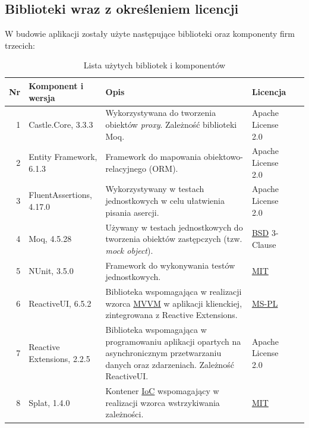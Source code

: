 \documentclass[10pt,a4paper]{article}
\begin{document}
\subsection{Biblioteki wraz z określeniem licencji}
W budowie aplikacji zostały użyte następujące biblioteki oraz komponenty firm trzecich:

\begin{table}[H]
	\begin{tabularx}{\textwidth}{|r|l|X|l|c|}
		\hline
		\textbf{Nr} & \textbf{Komponent i wersja} & \textbf{Opis} & \textbf{Licencja} & \\
		\hline
		1 & 
		Castle.Core, 3.3.3 &
		Wykorzystywana do tworzenia obiektów \textit{proxy}. Zależność biblioteki Moq. &
		Apache License 2.0 &
		\cite{castlecore} \\
		\hline
		2 &
		Entity Framework, 6.1.3 &
		Framework do mapowania obiektowo-relacyjnego (ORM). &
		Apache License 2.0 &
		\cite{entityframework} \\
		\hline
		3 &
		FluentAssertions, 4.17.0 &
		Wykorzystywany w testach jednostkowych w celu ułatwienia pisania asercji. &
		Apache License 2.0 &
		\cite{fluentassertions} \\
		\hline
		4 &
		Moq, 4.5.28 &
		Używany w testach jednostkowych do tworzenia obiektów zastępczych (tzw. \emph{mock object}). &
		\mbox{\hyperref[abbr:bsd]{BSD}} 3-Clause &
		\cite{moq} \\
		\hline
		5 &
		NUnit, 3.5.0 &
		Framework do wykonywania testów jednostkowych. &
		\mbox{\hyperref[abbr:mit]{MIT}} &
		\cite{nunit} \\
		\hline
		6 &
		ReactiveUI, 6.5.2 &
		Biblioteka wspomagająca w realizacji wzorca \hyperref[abbr:mvvm]{MVVM} w aplikacji klienckiej, zintegrowana z Reactive Extensions. &
		\mbox{\hyperref[abbr:mspl]{MS-PL}} &
		\cite{reactiveui} \\
		\hline
		7 &
		Reactive Extensions, 2.2.5 &
		Biblioteka wspomagająca w programowaniu aplikacji opartych na asynchronicznym przetwarzaniu danych oraz zdarzeniach. Zależność ReactiveUI. &
		Apache License 2.0 &
		\cite{reactiveextensions} \\
		\hline
		8 &
		Splat, 1.4.0 &
		Kontener \hyperref[abbr:ioc]{IoC} wspomagający w realizacji wzorca wstrzykiwania zależności. &
		\mbox{\hyperref[abbr:mit]{MIT}} &
		\cite{splat} \\
		\hline
	\end{tabularx}
	\caption{Lista użytych bibliotek i komponentów}
\end{table}
\end{document}
